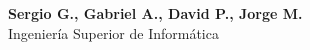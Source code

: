 \documentclass[a4paper, 10pt, twoside]{book}
\title{\titulo}
\author{\autor}
\makeatletter
\def\titulo{SISTEMA DE TIENDA ONLINE}
\def\subtitulo{Ingeniería del Software\\2011-2012}
\def\autor{Sergio G., Gabriel A., David P., Jorge M.}
\def\descripcionautor{Ingeniería Superior de Informática}
\def\email{perico@dominio.es}
\def\web{www.sgmonda.com}
\def\telefono{661783482}
\makeatother
\begin{document}



\pagestyle{empty}







\newpage
\mbox{}
\vspace{16cm}
\begin{adjustwidth*}{-100pt}{50pt} %
  {\bf\autor}\\[0.1cm]
  \descripcionautor\\[0.3cm]

  \vspace{0.5cm}
  \begin{small}
    
  \end{small}

\end{adjustwidth*}
\end{document}
